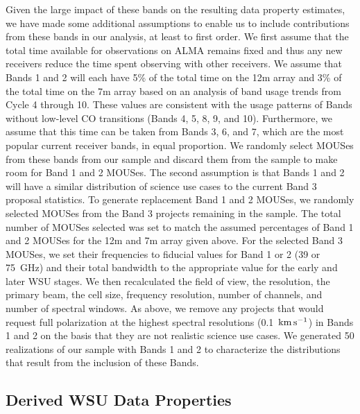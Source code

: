 \documentclass[preprint]{aastex631}
\newcommand{\kms}{\ensuremath{\rm{ km \, s^{-1}}}}
\begin{document}
Given the large impact of these bands on the resulting data property estimates, we have made some additional assumptions to enable us to include contributions from these bands in our analysis, at least to first order. We first assume that the total time available for observations on ALMA remains fixed and thus any new receivers reduce the time spent observing with other receivers. We assume that Bands 1 and 2 will each have 5\% of the total time on the 12m array and 3\% of the total time on the 7m array based on an analysis of band usage trends from Cycle 4 through 10. These values are consistent with the usage patterns of Bands without low-level CO transitions (Bands 4, 5, 8, 9, and 10). Furthermore, we assume that this time can be taken from Bands 3, 6, and 7, which are the most popular current receiver bands, in equal proportion. We randomly select MOUSes from these bands from our sample and discard them from the sample to make room for Band 1 and 2 MOUSes. The second assumption is that Bands 1 and 2 will have a similar distribution of science use cases to the current Band 3 proposal statistics. To generate replacement Band 1 and 2 MOUSes, we randomly selected MOUSes from the Band 3 projects remaining in the sample. The total number of MOUSes selected was set to match the assumed percentages of Band 1 and 2 MOUSes for the 12m and 7m array given above. For the selected Band 3 MOUSes, we set their frequencies to fiducial values for Band 1 or 2 (39 or 75~GHz) and their total bandwidth to the appropriate value for the early and later WSU stages.  We then recalculated the field of view, the resolution, the primary beam, the cell size, frequency resolution,  number of channels, and number of spectral windows. As above, we remove any projects that would request full polarization at the highest spectral resolutions (0.1~\kms) in Bands 1 and 2 on the basis that they are not  realistic science use cases. We generated 50 realizations of our sample with Bands 1 and 2 to characterize the distributions that result from the inclusion of these Bands. 


\subsection{Derived WSU Data Properties} \label{sec:wsu_derived_properties}
\end{document}
